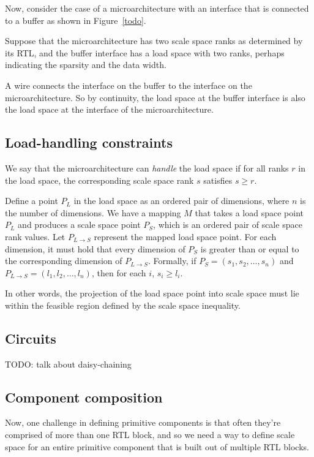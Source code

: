 Now, consider the case of a microarchitecture with an interface that is connected to a buffer as shown in Figure~\ref{todo}.

Suppose that the microarchitecture has two scale space ranks as determined by its RTL, and the buffer interface has a load space with two ranks, perhaps indicating the sparsity and the data width.

A wire connects the interface on the buffer to the interface on the microarchitecture. So by continuity, the load space at the buffer interface is also the load space at the interface of the microarchitecture.

\subsection{Load-handling constraints}

We say that the microarchitecture can \textit{handle} the load space if for all ranks $r$ in the load space, the corresponding scale space rank $s$ satisfies $s \geq r$.

Define a point $P_L$ in the load space as an ordered pair of dimensions, where $n$ is the number of dimensions. We have a mapping $M$ that takes a load space point $P_L$ and produces a scale space point $P_S$, which is an ordered pair of scale space rank values. Let $P_{L \rightarrow S}$ represent the mapped load space point. For each dimension, it must hold that every dimension of $P_S$ is greater than or equal to the corresponding dimension of $P_{L \rightarrow S}$. Formally, if $P_S = (s_1, s_2, \ldots, s_n)$ and $P_{L \rightarrow S} = (l_1, l_2, \ldots, l_n)$, then for each $i$, $s_i \geq l_i$.

In other words, the projection of the load space point into scale space must lie within the feasible region defined by the scale space inequality.

\subsection{Circuits}

TODO: talk about daisy-chaining

\subsection{Component composition}

Now, one challenge in defining primitive components is that often they're comprised of more than one RTL block, and so we need a way to define scale space for an entire primitive component that is built out of multiple RTL blocks.

